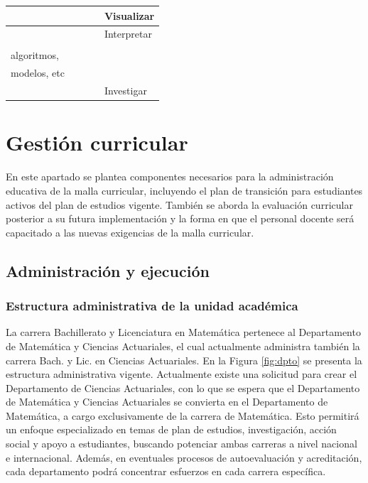 {\begin{longtable}{|l|l|l|l|l|}
\rowcolor[HTML]{8ED8F8} 
 &  &  &  & Visualizar \\ \hline
 &  &  &  & Interpretar \\ \hline
\rowcolor[HTML]{8ED8F8} 
 &  &  &  & \begin{tabular}[c]{@{}l@{}}Desarrollar:\\ algoritmos, \\ modelos, etc\end{tabular} \\ \hline
 &  &  &  & Investigar \\ \hline
\end{longtable}
}

\chapter{Gestión curricular}
En este apartado se plantea componentes necesarios para la administración educativa de la malla curricular, incluyendo el plan de transición para estudiantes activos del plan de estudios vigente. También se aborda la evaluación curricular posterior a su futura implementación y la forma en que el personal docente será capacitado a las nuevas exigencias de la malla curricular.

\section{Administración y ejecución}

\subsection{Estructura administrativa de la unidad académica}

La carrera Bachillerato y Licenciatura en Matemática pertenece al Departamento de Matemática y Ciencias Actuariales, el cual actualmente administra también la carrera Bach. y Lic. en Ciencias Actuariales. En la Figura \ref{fig:dpto} se presenta la estructura administrativa vigente. Actualmente existe una solicitud para crear el Departamento de Ciencias Actuariales, con lo que se espera que el Departamento de Matemática y Ciencias Actuariales se convierta en el Departamento de Matemática, a cargo exclusivamente de la carrera de Matemática. Esto permitirá un enfoque especializado en temas de plan de estudios, investigación, acción social y apoyo a estudiantes, buscando potenciar ambas carreras a nivel nacional e internacional. Además, en eventuales procesos de autoevaluación y acreditación, cada departamento podrá concentrar esfuerzos en cada carrera específica.

